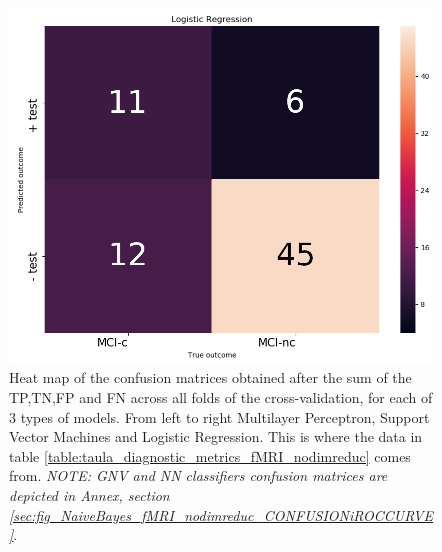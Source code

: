 \documentclass[a4paper,12pt]{elsarticle}  %
\begin{document}
\begin{figure}[h]
\begin{minipage}{.33\textwidth}
			\end{minipage}
			\begin{minipage}{.33\textwidth}
				\centering
				\includegraphics[width=1\linewidth]{fig_LR_fMRI_nodimreduc_CONFUSION.png}
			\end{minipage}
			\caption{Heat map of the confusion matrices obtained after the sum of the TP,TN,FP and FN across all folds of the cross-validation, for each of 3 types of models. From left to right Multilayer Perceptron, Support Vector Machines and Logistic Regression. This is where the data in table \ref{table:taula_diagnostic_metrics_fMRI_nodimreduc} comes from. \textit{NOTE: GNV and NN classifiers confusion matrices are depicted in Annex, section \ref{sec:fig_NaiveBayes_fMRI_nodimreduc_CONFUSIONiROCCURVE}}.}
			\label{fig:bestperformingmodels_CONFUSIONS}
		\end{figure}
		\FloatBarrier
		
		
		
		
		
\end{document}
